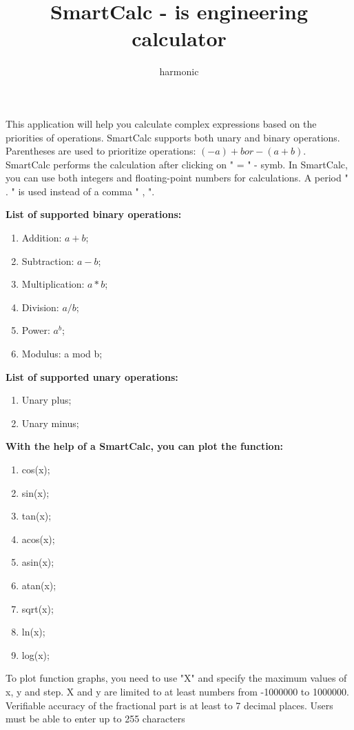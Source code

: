 \documentclass{article}
\title{SmartCalc - is engineering calculator}
\author{harmonic}
\begin{document}
\maketitle
This application will help you calculate complex expressions based on the priorities of operations.
SmartCalc supports both unary and binary operations. Parentheses are used to prioritize operations: $ ( -a ) + b  or  - ( a + b ) $.
SmartCalc performs the calculation after clicking on " = " - symb. 
In SmartCalc, you can use both integers and floating-point numbers for calculations. A period " . " is used instead of a comma " , ".

\textbf{List of supported binary operations:}
\begin{enumerate}
\item Addition: $a + b$;
\item Subtraction: $a - b$;
\item Multiplication: $a * b$;
\item Division: $a / b$;
\item Power: $a ^ b$;
\item Modulus: a mod b;
\end{enumerate}

\textbf{List of supported unary operations:}
\begin{enumerate}
\item Unary plus;
\item Unary minus;
\end{enumerate}

\textbf{With the help of a SmartCalc, you can plot the function:}
\begin{enumerate}
\item cos(x);
\item sin(x);
\item tan(x);
\item acos(x);
\item asin(x);
\item atan(x);
\item sqrt(x);
\item ln(x);
\item log(x);
\end{enumerate}

To plot function graphs, you need to use "X" and specify the maximum values of x, y and step. 
X and y are limited to at least numbers from -1000000 to 1000000.
Verifiable accuracy of the fractional part is at least to 7 decimal places.
Users must be able to enter up to 255 characters
\end{document}
